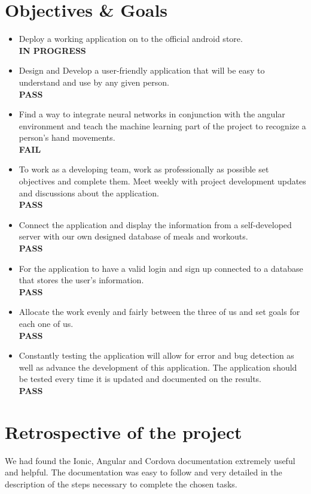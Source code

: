 \documentclass[a4paper,12pt]{report}
\begin{document}
\section{Objectives \& Goals}

\begin{itemize}
\item Deploy a working application on to the official android store.\\
\textbf{IN PROGRESS}
\item Design and Develop a user-friendly application that will be easy to understand and use by any given person.\\
\textbf{PASS}
\item  Find a way to integrate neural networks in conjunction with the angular environment and teach the machine learning part of the project to recognize a person's hand movements.\\
\textbf{FAIL}
\newpage
\item To work as a developing team, work as professionally as possible set objectives and complete them. Meet weekly with project development updates and discussions about the application.\\
\textbf{PASS}
\item Connect the application and display the information from a self-developed server with our own designed database of meals and workouts.\\
\textbf{PASS}
\item For the application to have a valid login and sign up connected to a database that stores the user's information.\\
\textbf{PASS}
\item Allocate the work evenly and fairly between the three of us and set goals for each one of us.\\
\textbf{PASS}
\item Constantly testing the application will allow for error and bug detection as well as advance the development of this application. The application should be tested every time it is updated and documented on the results.\\
\textbf{PASS}
\end{itemize}

\section{Retrospective of the project}

We had found the Ionic, Angular and Cordova documentation extremely useful and helpful. 
The documentation was easy to follow and very detailed in the description of the steps necessary to complete the chosen tasks.
\end{document}
